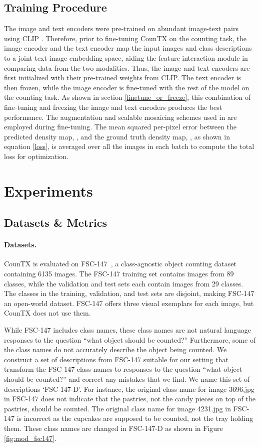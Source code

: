 \documentclass{bmvc2k}
\begin{document}
\subsection{Training Procedure}\label{train}
The image and text encoders were pre-trained on abundant image-text pairs using CLIP \cite{Radford2021LearningTV}. Therefore, prior to fine-tuning CounTX on the counting task, the image encoder and the text encoder map the input images and class descriptions to a joint text-image embedding space, aiding the feature interaction module in comparing data from the two modalities. Thus, the image and text encoders are first initialized with their pre-trained weights from CLIP. The text encoder is then frozen, while the image encoder is fine-tuned with the rest of the model on the counting task. As shown in section \ref{finetune_or_freeze}, this combination of fine-tuning and freezing the image and text encoders produces the best performance. The augmentation and scalable mosaicing schemes used in \cite{Liu2022CounTRTG} are employed during fine-tuning. The mean squared per-pixel error between the predicted density map, , and the ground truth density map, , as shown in equation \ref{loss}, is averaged over all the images in each batch to compute the total loss for optimization.

 \section{Experiments}

\subsection{Datasets \& Metrics}
\paragraph{Datasets.}
CounTX is evaluated on FSC-147~\cite{m_Ranjan-etal-CVPR21}, a class-agnostic object counting dataset containing 6135 images. The FSC-147 training set contains images from 89 classes, while the validation and test sets each contain images from 29 classes. The classes in the training, validation, and test sets are disjoint, making FSC-147 an open-world dataset. FSC-147 offers three visual exemplars for each image, but CounTX does not use them. 

While FSC-147 includes class names, these class names are not natural language responses to the question ``what object should be counted?'' Furthermore, some of the class names do not accurately describe the object being counted. We construct a set of descriptions  from FSC-147 suitable for our setting that transform the FSC-147 class names to responses to the question ``what object should be counted?'' and correct any mistakes that we find. We name this set of descriptions `FSC-147-D'. For instance, the original class name for image 3696.jpg in FSC-147 does not indicate that the pastries, not the candy pieces on top of the pastries, should be counted. The original class name for image 4231.jpg in FSC-147 is incorrect as the cupcakes are supposed to be counted, not the tray holding them. These class names are changed in FSC-147-D as shown in Figure \ref{fig:mod_fsc147}.
\end{document}
